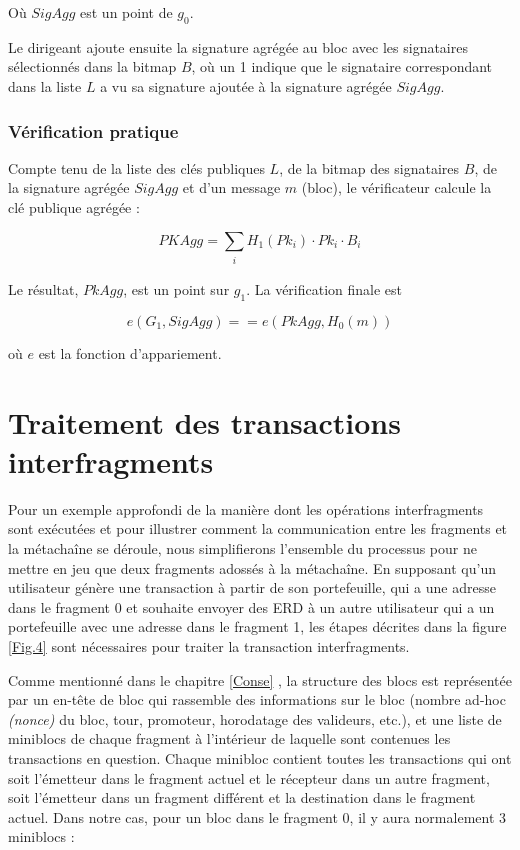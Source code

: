 \documentclass[journal]{IEEEtran}
\begin{document}
Où $SigAgg$ est un point de ${g}_{0}$.

Le dirigeant ajoute ensuite la signature agrégée au bloc avec les signataires sélectionnés dans la bitmap $B$, où un 1 indique que le signataire correspondant dans la liste $L$ a vu sa signature ajoutée à la signature agrégée $SigAgg$.

\subsubsection{Vérification pratique}
Compte tenu de la liste des clés publiques $L$, de la bitmap des signataires $B$, de la signature agrégée $SigAgg$ et d'un message $m$ (bloc), le vérificateur calcule la clé publique agrégée :

\begin{equation}
\label{6}
   PKAgg  = \sum_{\substack{i}}{H}_{1}({Pk}_{i})\cdot    {Pk}_{i}  \cdot  {B}_{i}
\end{equation}

Le résultat, $PkAgg$, est un point sur ${g}_{1}$. La vérification finale est  

\begin{equation}
\label{7}
   e({G}_{1}, SigAgg) == e(PkAgg, {H}_{0}(m))
\end{equation}

où $e$ est la fonction d'appariement.

\section{Traitement des transactions interfragments}
\label{Inter}
Pour un exemple approfondi de la manière dont les opérations interfragments sont exécutées et pour  illustrer comment la communication entre les fragments et la métachaîne se déroule, nous simplifierons l'ensemble du processus pour ne mettre en jeu que deux fragments adossés à la métachaîne. En supposant qu'un utilisateur génère une transaction à partir de son portefeuille, qui a une adresse dans le fragment 0 et souhaite envoyer des ERD à un autre utilisateur qui a un portefeuille avec une adresse dans le fragment 1, les étapes décrites dans la figure \ref{Fig.4} sont nécessaires pour traiter la transaction interfragments. 

Comme mentionné dans le chapitre  \ref{Conse} , la structure des blocs est représentée par un en-tête de bloc qui rassemble des informations sur le bloc (nombre ad-hoc \textit{(nonce)}  du bloc, tour, promoteur, horodatage des valideurs, etc.), et une liste de miniblocs de chaque fragment à l'intérieur de laquelle sont contenues les transactions en question. Chaque minibloc contient toutes les transactions qui ont soit l'émetteur dans le fragment actuel et le récepteur dans un autre fragment, soit l'émetteur dans un fragment différent et la destination dans le fragment actuel. Dans notre cas, pour un bloc dans le fragment 0, il y aura normalement 3 miniblocs :
\end{document}
